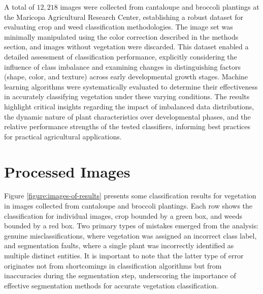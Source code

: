\documentclass[letterpaper]{report}
\begin{document}
A total of $12,218$ images were collected from cantaloupe and broccoli plantings at the Maricopa Agricultural Research Center, establishing a robust dataset for evaluating crop and weed classification methodologies. The image set was minimally manipulated using the color correction described in the methods section, and images without vegetation were discarded. This dataset enabled a detailed assessment of classification performance, explicitly considering the influence of class imbalance and examining changes in distinguishing factors (shape, color, and texture) across early developmental growth stages. Machine learning algorithms were systematically evaluated to determine their effectiveness in accurately classifying vegetation under these varying conditions. The results highlight critical insights regarding the impact of imbalanced data distributions, the dynamic nature of plant characteristics over developmental phases, and the relative performance strengths of the tested classifiers, informing best practices for practical agricultural applications.

\section{Processed Images}
Figure \ref{figure:images-of-results} presents  some classification results for vegetation in images collected from cantaloupe and broccoli plantings. Each row shows the classification for individual images, crop bounded by a green box, and weeds bounded by a red box. Two primary types of mistakes emerged from the analysis: genuine misclassifications, where vegetation was assigned an incorrect class label, and segmentation faults, where a single plant was incorrectly identified as multiple distinct entities. It is important to note that the latter type of error originates not from shortcomings in classification algorithms but from inaccuracies during the segmentation step, underscoring the importance of effective segmentation methods for accurate vegetation classification.
\end{document}
